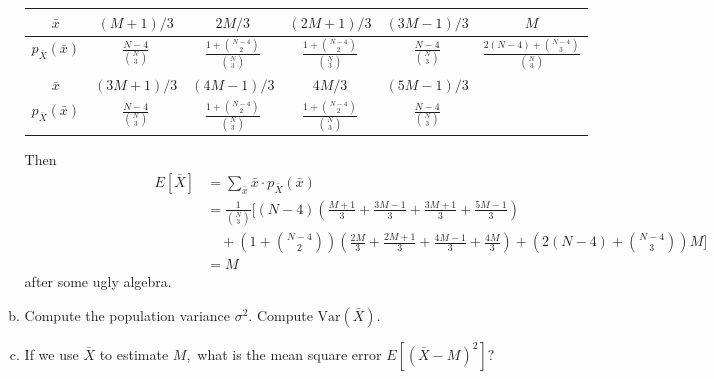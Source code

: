 \documentclass{article}
\newcommand{\var}{\mathrm{Var}}
\begin{document}
\begin{enumerate}
\begin{enumerate}[(a)]
\begin{soln}
					\begin{center}
						\begin{tabular}{c||c|c|c|c|c}
							$\bar{x}$ & $(M+1)/3$ & $2M/3$ & $(2M+1)/3$ & $(3M-1)/3$ & $M$ \\
							\hline
							$p_{\bar{X}}(\bar{x})$ & $\displaystyle\frac{N-4}{\binom{N}{3}}$ & $\displaystyle\frac{1+\binom{N-4}{2}}{\binom{N}{3}}$ & $\displaystyle\frac{1+\binom{N-4}{2}}{\binom{N}{3}}$ & $\displaystyle\frac{N-4}{\binom{N}{3}}$ & $\displaystyle\frac{2(N-4)+\binom{N-4}{3}}{\binom{N}{3}}$ \\
							\hline
							$\bar{x}$ & $(3M+1)/3$ & $(4M-1)/3$ & $4M/3$ & $(5M-1)/3$ & \\
							\hline
							$p_{\bar{X}}(\bar{x})$ & $\displaystyle\frac{N-4}{\binom{N}{3}}$ & $\displaystyle\frac{1+\binom{N-4}{2}}{\binom{N}{3}}$ & $\displaystyle\frac{1+\binom{N-4}{2}}{\binom{N}{3}}$ & $\displaystyle\frac{N-4}{\binom{N}{3}}$ & 
						\end{tabular}
					\end{center}
					Then
					\begin{align*}
						E[\bar{X}] &= \sum_{\bar{x}} \bar{x}\cdot p_{\bar{X}} (\bar{x}) \\
						&= \frac{1}{\binom{N}{3}} \Bigg[(N-4)\left( \frac{M+1}{3} + \frac{3M-1}{3} + \frac{3M+1}{3} + \frac{5M-1}{3} \right) \\
						&\quad+\left( 1+\binom{N-4}{2} \right)\left( \frac{2M}{3}+\frac{2M+1}{3}+\frac{4M-1}{3}+\frac{4M}{3} \right) + \left( 2(N-4)+\binom{N-4}{3} \right)M \Bigg] \\
						&= \boxed{M}
					\end{align*} after some ugly algebra.
					
				\end{soln}

			\item Compute the population variance $\sigma^2.$ Compute $\var(\bar{X}).$ 

			\item If we use $\bar{X}$ to estimate $M,$ what is the mean square error $E[(\bar{X}-M)^2]?$


\end{enumerate}
\end{enumerate}
\end{document}
